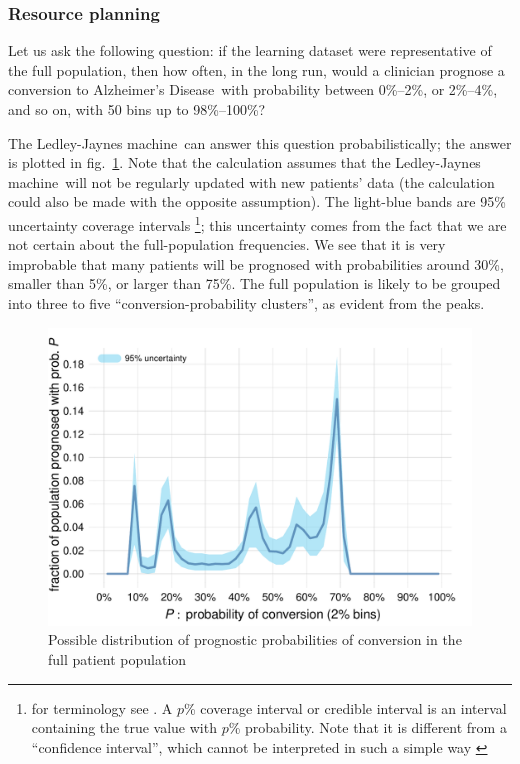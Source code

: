 \documentclass[utf8]{FrontiersinHarvard} %
\newcommand*{\sect}{\S}%
\newcommand*{\fig}{fig.}%
\renewcommand*{\|}[1][]{\nonscript\:#1\vert\nonscript\:\mathopen{}}
\newcommand*{\ad}{Alzheimer's Disease}
\newcommand*{\ljm}{Ledley-Jaynes machine}
\begin{document}
\subsubsection{Resource planning}
\label{sec:resource_planning}

Let us ask the following question: if the learning dataset were representative of the full population, then how often, in the long run, would a clinician prognose a conversion to \ad\ with probability between 0\%--2\%, or 2\%--4\%, and so on, with 50 bins up to 98\%--100\%?

The \ljm\ can answer this question probabilistically; the answer is plotted in \fig~\ref{fig:progn_probs}. Note that the calculation assumes that the \ljm\ will not be regularly updated with new patients' data (the calculation could also be made with the opposite assumption). The light-blue bands are 95\% uncertainty coverage intervals \footnote{for terminology see \citet[C.2.30]{jcgm1993_r2008}. A $p$\% coverage interval or credible interval is an interval containing the true value with $p$\% probability. Note that it is different from a \enquote{confidence interval}, which cannot be interpreted in such a simple way \citetext{\citealp[pp.~165--166]{pratt1961}; \citealp{jaynes1976}; \citealp[\sect~37.3]{mackay1995_r2005}}}; this uncertainty comes from the fact that we are not certain about the full-population frequencies. We see that it is very improbable that many patients will be prognosed with probabilities around 30\%, smaller than 5\%, or larger than 75\%. The full population is likely to be grouped into three to five \enquote{conversion-probability clusters}, as evident from the peaks. %
\begin{figure}[b]%
  \centering%
\includegraphics[width=0.75\linewidth]{plotnextpatientconvprob.pdf}%
  \caption{Possible distribution of prognostic probabilities of conversion in the full patient population}\label{fig:progn_probs}
\end{figure}%
\end{document}
